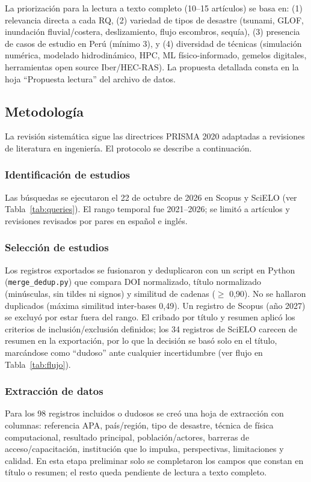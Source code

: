 \documentclass[12pt,a4paper]{article}
\begin{document}
La priorización para la lectura a texto completo (10--15 artículos) se basa en: (1) relevancia directa a cada RQ, (2) variedad de tipos de desastre (tsunami, GLOF, inundación fluvial/costera, deslizamiento, flujo escombros, sequía), (3) presencia de casos de estudio en Perú (mínimo 3), y (4) diversidad de técnicas (simulación numérica, modelado hidrodinámico, HPC, ML físico-informado, gemelos digitales, herramientas open source Iber/HEC-RAS). La propuesta detallada consta en la hoja ``Propuesta lectura'' del archivo de datos.

\subsection{Metodología}
La revisión sistemática sigue las directrices PRISMA 2020 adaptadas a revisiones de literatura en ingeniería. El protocolo se describe a continuación.

\subsubsection{Identificación de estudios}
Las búsquedas se ejecutaron el 22 de octubre de 2026 en Scopus y SciELO (ver Tabla~\ref{tab:queries}). El rango temporal fue 2021--2026; se limitó a artículos y revisiones revisados por pares en español e inglés.

\subsubsection{Selección de estudios}
Los registros exportados se fusionaron y deduplicaron con un script en Python (\texttt{merge\_dedup.py}) que compara DOI normalizado, título normalizado (minúsculas, sin tildes ni signos) y similitud de cadenas ($\ge$ 0,90). No se hallaron duplicados (máxima similitud inter-bases 0,49). Un registro de Scopus (año 2027) se excluyó por estar fuera del rango. El cribado por título y resumen aplicó los criterios de inclusión/exclusión definidos; los 34 registros de SciELO carecen de resumen en la exportación, por lo que la decisión se basó solo en el título, marcándose como ``dudoso'' ante cualquier incertidumbre (ver flujo en Tabla~\ref{tab:flujo}).

\subsubsection{Extracción de datos}
Para los 98 registros incluidos o dudosos se creó una hoja de extracción con columnas: referencia APA, país/región, tipo de desastre, técnica de física computacional, resultado principal, población/actores, barreras de acceso/capacitación, institución que lo impulsa, perspectivas, limitaciones y calidad. En esta etapa preliminar solo se completaron los campos que constan en título o resumen; el resto queda pendiente de lectura a texto completo.
\end{document}
